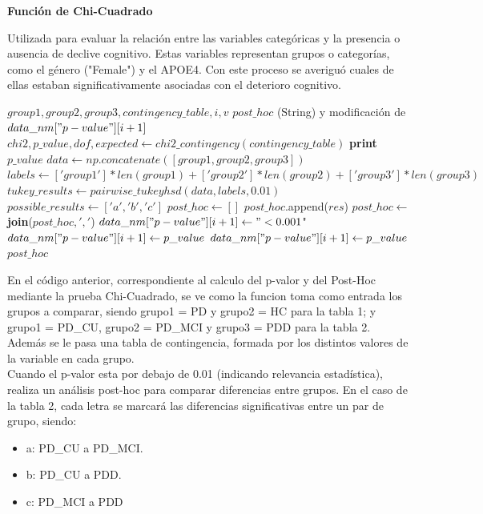 \documentclass[12pt]{article}
\begin{document}
\begin{description}
	
	\item {\textbf{Función de Chi-Cuadrado}} 
	
	Utilizada para evaluar la relación entre las variables categóricas y la presencia o ausencia de declive cognitivo. Estas variables representan grupos o categorías, como el género ("Female") y el APOE4. Con este proceso se averiguó cuales de ellas estaban significativamente asociadas con el deterioro cognitivo.\\
\begin{algorithm}
	\caption{chi\_square\_with\_posthoc}
	\begin{algorithmic}[1]
		\REQUIRE $group1, group2, group3, contingency\_table, i, v$
		\ENSURE $post\_hoc$ (String) y modificación de $data\_nm["p-value"][i+1]$
		\STATE $chi2, p\_value, dof, expected \leftarrow chi2\_contingency(contingency\_table)$
		\STATE \textbf{print} $p\_value$
		\STATE $data \leftarrow np.concatenate([group1, group2, group3])$
		\STATE $labels \leftarrow ['group1'] * len(group1) + ['group2'] * len(group2) + ['group3'] * len(group3)$
		\STATE $tukey\_results \leftarrow pairwise\_tukeyhsd(data, labels, 0.01)$
		\STATE $possible\_results \leftarrow ['a', 'b', 'c']$
		\STATE $post\_hoc \leftarrow []$
		\STATE $post\_hoc$.append($res$)
		\ENDIF
		\ENDFOR
		\STATE $post\_hoc \leftarrow$ \textbf{join}($post\_hoc, ','$)
		\STATE $data\_nm["p-value"][i+1] \leftarrow "< 0.001$"
		\ELSE
		\STATE $data\_nm["p-value"][i+1] \leftarrow p\_value$
		\ENDIF
		\ELSE
		\STATE $data\_nm["p-value"][i+1] \leftarrow p\_value$
		\ENDIF
		\RETURN $post\_hoc$
	\end{algorithmic}
\end{algorithm}

	En el código anterior, correspondiente al calculo del p-valor y del Post-Hoc mediante la prueba Chi-Cuadrado, se ve como la funcion toma como entrada los grupos a comparar, siendo grupo1 = PD y grupo2 = HC para la tabla 1; y grupo1 = PD\_CU, grupo2 = PD\_MCI y grupo3 = PDD para la tabla 2. Además se le pasa una tabla de contingencia, formada por los distintos valores de la variable en cada grupo.\\
		
	Cuando el p-valor esta por debajo de 0.01 (indicando relevancia estadística), realiza un análisis post-hoc para comparar diferencias entre grupos. En el caso de la tabla 2, cada letra se marcará las diferencias significativas entre un  par de grupo, siendo:
	\begin{itemize}
		\item a: PD\_CU a PD\_MCI.
		\item b: PD\_CU a PDD.
		\item c: PD\_MCI a PDD
	\end{itemize}
	

\end{description}
\end{document}
